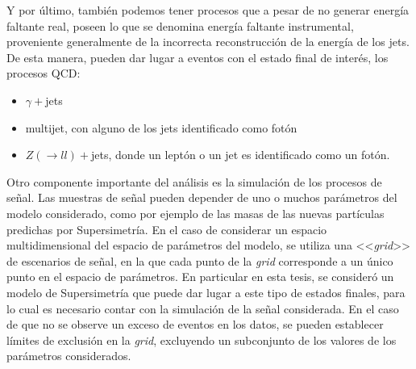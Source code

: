 Y por último, también podemos tener procesos que a pesar de no generar energía
faltante real, poseen lo que se denomina energía faltante instrumental,
proveniente generalmente de la incorrecta reconstrucción de la energía de los
jets. De esta manera, pueden dar lugar a eventos con el estado final de interés,
los procesos QCD:

\begin{itemize}
\item $\gamma+$jets
\item multijet, con alguno de los jets identificado como fotón
\item $Z(\to ll)+$jets, donde un leptón o un jet es identificado como un fotón.
\end{itemize}




Otro componente importante del análisis es la simulación de los procesos de
señal. Las muestras de señal pueden depender de uno o muchos parámetros del
modelo considerado, como por ejemplo de las masas de las nuevas partículas
predichas por Supersimetría. En el caso de considerar un espacio
multidimensional del espacio de parámetros del modelo, se utiliza una
<<\emph{grid}>> de escenarios de señal, en la que cada punto de la \emph{grid}
corresponde a un único punto en el espacio de parámetros. En particular en esta
tesis, se consideró un modelo de Supersimetría que puede dar lugar a este tipo
de estados finales, para lo cual es necesario contar con la simulación de la
señal considerada. En el caso de que no se observe un exceso de eventos en los
datos, se pueden establecer límites de exclusión en la \emph{grid}, excluyendo
un subconjunto de los valores de los parámetros considerados.


